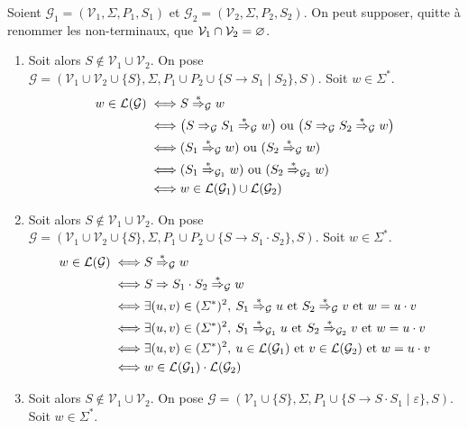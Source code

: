 \begin{prv}
	Soient $\mathcal{G}_1 = (\mathcal{V}_1, \Sigma, P_1, S_1)$ et $\mathcal{G}_2 = (\mathcal{V}_2, \Sigma, P_2, S_2)$.
	On peut supposer, quitte à renommer les non-terminaux, que $\mathcal{V}_1 \cap \mathcal{V}_2 = \varnothing$.
	\begin{enumerate}
		\item Soit alors $S \not\in \mathcal{V}_1 \cup \mathcal{V}_2$. On pose $\mathcal{G} = (\mathcal{V}_1 \cup \mathcal{V}_2 \cup \{S\}, \Sigma, P_1 \cup P_2 \cup \{S \to S_1  \mid S_2\}, S)$.
			Soit $w \in \Sigma^*$.
			\begin{align*}
				w \in \mathcal{L}(\mathcal{G}) \iff& S \mathrel{\overset*\Rightarrow}_\mathcal{G} w \\
				\iff& \big(S \Rightarrow_\mathcal{G} S_1 \mathrel{\overset*\Rightarrow}_\mathcal{G} w\big) \text{ ou } \big(S \Rightarrow_\mathcal{G} S_2 \mathrel{\overset*\Rightarrow}_\mathcal{G} w\big) \\
				\iff& (S_1 \mathrel{\overset*\Rightarrow}_\mathcal{G} w) \text{ ou } (S_2 \mathrel{\overset*\Rightarrow}_\mathcal{G} w) \\
				\iff& (S_1 \mathrel{\overset*\Rightarrow}_{\mathcal{G}_1} w) \text{ ou } (S_2 \mathrel{\overset*\Rightarrow}_{\mathcal{G}_2} w) \\
				\iff& w \in \mathcal{L}(\mathcal{G}_1) \cup \mathcal{L}(\mathcal{G}_2) \\
			\end{align*}
		\item Soit alors $S \not\in \mathcal{V}_1 \cup \mathcal{V}_2$. On pose $\mathcal{G} = (\mathcal{V}_1 \cup \mathcal{V}_2 \cup \{S\}, \Sigma, P_1 \cup P_2 \cup \{S \to S_1 \cdot S_2\}, S)$. Soit $w \in \Sigma^*$.
			\begin{align*}
				w \in \mathcal{L}(\mathcal{G}) \iff& S \mathrel{\overset*\Rightarrow}_\mathcal{G} w \\
				\iff& S \Rightarrow S_1 \cdot S_2 \mathrel{\overset*\Rightarrow}_\mathcal{G} w \\
				\iff& \exists (u,v) \in (\varSigma^*)^2,\: S_1 \mathrel{\overset*\Rightarrow}_{\mathcal{G}} u \text{ et } S_2 \mathrel{\overset*\Rightarrow}_\mathcal{G} v \text{ et } w = u \cdot v \\
				\iff& \exists (u,v) \in (\varSigma^*)^2,\: S_1 \mathrel{\overset*\Rightarrow}_{\mathcal{G}_1} u \text{ et } S_2 \mathrel{\overset*\Rightarrow}_{\mathcal{G}_2} v \text{ et } w = u \cdot v \\
				\iff& \exists (u,v) \in (\varSigma^*)^2,\: u \in \mathcal{L}(\mathcal{G}_1) \text{ et } v \in \mathcal{L}(\mathcal{G}_2) \text{ et } w = u \cdot v \\
				\iff& w \in \mathcal{L}(\mathcal{G}_1) \cdot \mathcal{L}(\mathcal{G}_2) \\
			\end{align*}
		\item Soit alors $S \not\in \mathcal{V}_1 \cup \mathcal{V}_2$. On pose $\mathcal{G} = (\mathcal{V}_1 \cup \{S\}, \Sigma, P_1 \cup \{S \to S\cdot S_1 \mid \varepsilon\}, S)$. Soit $w \in \Sigma^*$.

\end{enumerate}
\end{prv}
